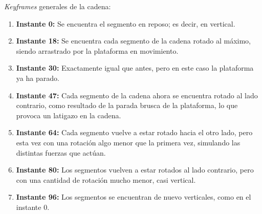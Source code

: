 \documentclass{article}
\begin{document}
\bigskip

\textit{Keyframes} generales de la cadena:

\begin{enumerate}
    \item \textbf{Instante 0:} Se encuentra el segmento en reposo; es decir, en vertical.
    \item \textbf{Instante 18:} Se encuentra cada segmento de la cadena rotado al máximo, siendo arrastrado por la plataforma en movimiento.
    \item \textbf{Instante 30:} Exactamente igual que antes, pero en este caso la plataforma ya ha parado.
    \item \textbf{Instante 47:} Cada segmento de la cadena ahora se encuentra rotado al lado contrario, como resultado de la parada brusca de la plataforma, lo que provoca un latigazo en la cadena.
    \item \textbf{Instante 64:} Cada segmento vuelve a estar rotado hacia el otro lado, pero esta vez con una rotación algo menor que la primera vez, simulando las distintas fuerzas que actúan.
    \item \textbf{Instante 80:} Los segmentos vuelven a estar rotados al lado contrario, pero con una cantidad de rotación mucho menor, casi vertical.
    \item \textbf{Instante 96:} Los segmentos se encuentran de nuevo verticales, como en el instante 0.
\end{enumerate}
\bigskip
\end{document}

